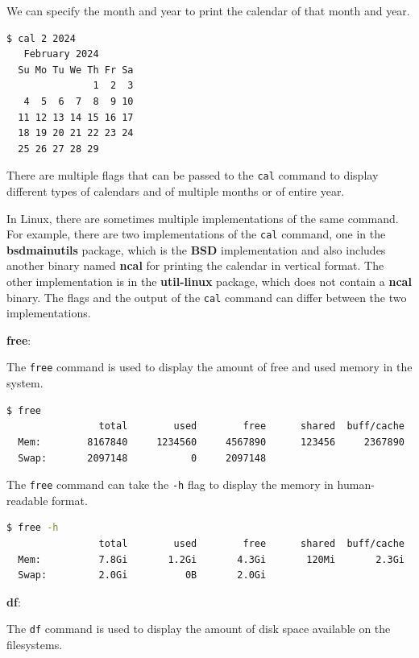 We can specify the month and year to print the calendar of that month and year.

\begin{lstlisting}[language=bash]
  $ cal 2 2024
   February 2024
  Su Mo Tu We Th Fr Sa
               1  2  3
   4  5  6  7  8  9 10
  11 12 13 14 15 16 17
  18 19 20 21 22 23 24
  25 26 27 28 29
\end{lstlisting}

There are multiple flags that can be passed to the \texttt{cal} command to display different types of calendars and of multiple months or of entire year.

\begin{remark}
  In Linux, there are sometimes multiple implementations of the same command.
  For example, there are two implementations of the \texttt{cal} command, one in the \textbf{bsdmainutils} package, which is the \textbf{BSD} implementation and also includes another binary named \textbf{ncal} for printing the calendar in vertical format.
  The other implementation is in the \textbf{util-linux} package, which does not contain a \textbf{ncal} binary.
  The flags and the output of the \texttt{cal} command can differ between the two implementations.
\end{remark}

\textbf{free}:

The \texttt{free} command is used to display the amount of free and used memory in the system.

\begin{lstlisting}[language=bash]
  $ free
                total        used        free      shared  buff/cache   available
  Mem:        8167840     1234560     4567890      123456     2367890     4567890
  Swap:       2097148           0     2097148
\end{lstlisting}

The \texttt{free} command can take the \texttt{-h} flag to display the memory in human-readable format.

\begin{lstlisting}[language=bash]
  $ free -h
                total        used        free      shared  buff/cache   available
  Mem:          7.8Gi       1.2Gi       4.3Gi       120Mi       2.3Gi       4.3Gi
  Swap:         2.0Gi          0B       2.0Gi
\end{lstlisting}

\textbf{df}:

The \texttt{df} command is used to display the amount of disk space available on the filesystems.

